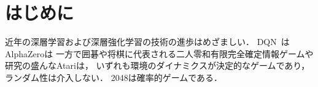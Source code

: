 \chapter{はじめに}
近年の深層学習および深層強化学習の技術の進歩はめざましい．
DQN~\cite{DQN}は
AlphaZeroは
一方で囲碁や将棋に代表される二人零和有限完全確定情報ゲームや研究の盛んなAtariは， いずれも環境のダイナミクスが決定的なゲームであり， ランダム性は介入しない．
2048は確率的ゲームである．